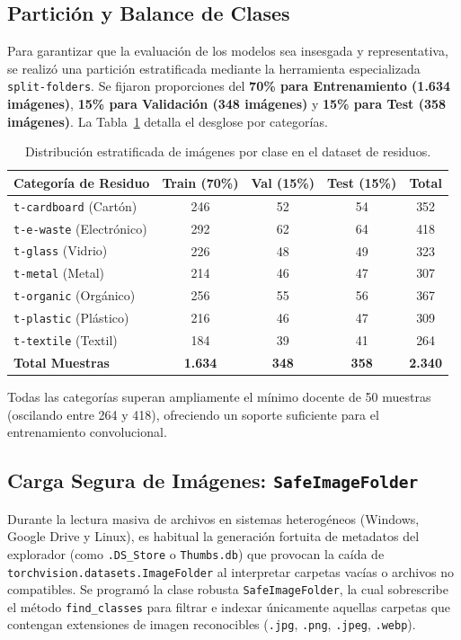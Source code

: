 \documentclass[11pt,a4paper]{article}
\begin{document}
\subsection{Partición y Balance de Clases}
Para garantizar que la evaluación de los modelos sea insesgada y representativa, se realizó una partición estratificada mediante la herramienta especializada \texttt{split-folders}. Se fijaron proporciones del \textbf{70\% para Entrenamiento (1.634 imágenes)}, \textbf{15\% para Validación (348 imágenes)} y \textbf{15\% para Test (358 imágenes)}. La Tabla~\ref{tab:dataset_distribution} detalla el desglose por categorías.

\begin{table}[H]
\centering
\caption{Distribución estratificada de imágenes por clase en el dataset de residuos.}
\label{tab:dataset_distribution}
\renewcommand{\arraystretch}{1.18}
\begin{tabular}{lcccc}
\toprule
\textbf{Categoría de Residuo} & \textbf{Train (70\%)} & \textbf{Val (15\%)} & \textbf{Test (15\%)} & \textbf{Total} \\
\midrule
\texttt{t-cardboard} (Cartón)     & 246 & 52 & 54 & 352 \\
\texttt{t-e-waste} (Electrónico)  & 292 & 62 & 64 & 418 \\
\texttt{t-glass} (Vidrio)         & 226 & 48 & 49 & 323 \\
\texttt{t-metal} (Metal)          & 214 & 46 & 47 & 307 \\
\texttt{t-organic} (Orgánico)     & 256 & 55 & 56 & 367 \\
\texttt{t-plastic} (Plástico)     & 216 & 46 & 47 & 309 \\
\texttt{t-textile} (Textil)       & 184 & 39 & 41 & 264 \\
\midrule
\textbf{Total Muestras}           & \textbf{1.634} & \textbf{348} & \textbf{358} & \textbf{2.340} \\
\bottomrule
\end{tabular}
\end{table}

Todas las categorías superan ampliamente el mínimo docente de 50 muestras (oscilando entre 264 y 418), ofreciendo un soporte suficiente para el entrenamiento convolucional.

\subsection{Carga Segura de Imágenes: \texttt{SafeImageFolder}}
Durante la lectura masiva de archivos en sistemas heterogéneos (Windows, Google Drive y Linux), es habitual la generación fortuita de metadatos del explorador (como \texttt{.DS\_Store} o \texttt{Thumbs.db}) que provocan la caída de \texttt{torchvision.datasets.ImageFolder} al interpretar carpetas vacías o archivos no compatibles. Se programó la clase robusta \texttt{SafeImageFolder}, la cual sobrescribe el método \texttt{find\_classes} para filtrar e indexar únicamente aquellas carpetas que contengan extensiones de imagen reconocibles (\texttt{.jpg}, \texttt{.png}, \texttt{.jpeg}, \texttt{.webp}).
\end{document}
